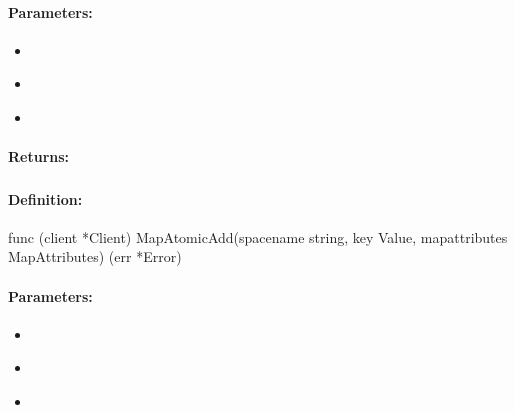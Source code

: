 \paragraph{Parameters:}
\begin{itemize}[noitemsep]
\item {}\\

\item {}\\

\item {}\\

\end{itemize}

\paragraph{Returns:}


\pagebreak
\subsubsection{}
\label{api:Go:MapAtomicAdd}


\paragraph{Definition:}
\begin{gocode}
func (client *Client) MapAtomicAdd(spacename string, key Value, mapattributes MapAttributes) (err *Error)
\end{gocode}

\paragraph{Parameters:}
\begin{itemize}[noitemsep]
\item {}\\

\item {}\\

\item {}\\

\end{itemize}

